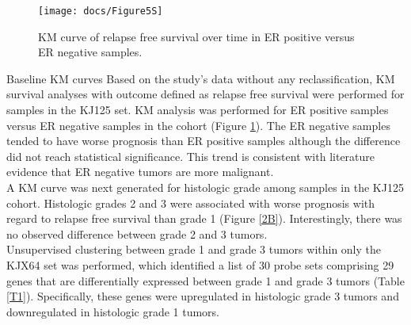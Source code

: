 \documentclass[a4paper,10pt]{article}
\begin{document}
 \begin{figure}
\centering
\vspace{-30pt}
\texttt{[image: docs/Figure5S]}
\caption{ KM curve of relapse free survival over time in ER positive versus ER negative samples.}\label{1B}
\vspace{-10pt}
\end{figure}
Baseline KM curves Based on the study’s data without any reclassification, KM survival analyses with outcome 
defined as relapse free survival were performed for samples in the KJ125 set.   KM analysis 
was performed for ER positive samples versus ER negative samples in the cohort (Figure \ref{1B}). 
The ER negative samples tended to have worse prognosis than ER positive samples although 
the difference did not reach statistical significance. This trend is consistent with literature 
evidence that ER negative tumors are more malignant.  \\

A KM curve was next generated for histologic grade among samples in the KJ125 cohort.  
Histologic grades 2 and 3 were associated with worse prognosis with regard to relapse 
free survival than grade 1 (Figure \ref{2B}).  Interestingly, there was no observed difference 
between grade 2 and 3 tumors.  \\

Unsupervised clustering between grade 1 and grade 3 tumors within only the 
KJX64 set was performed, which identified a list of 30 probe sets comprising 
29 genes that are differentially expressed between grade 1 and grade 3 tumors 
(Table \ref{T1}).  Specifically, these genes were upregulated in histologic grade 3 tumors 
and downregulated in histologic grade 1 tumors.  \\
\end{document}
